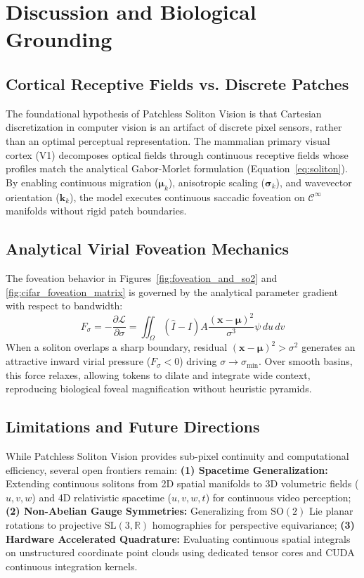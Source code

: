 \documentclass[10pt,twocolumn]{article}
\begin{document}
\section{Discussion and Biological Grounding}

\subsection{Cortical Receptive Fields vs. Discrete Patches}
The foundational hypothesis of Patchless Soliton Vision is that Cartesian discretization in computer vision is an artifact of discrete pixel sensors, rather than an optimal perceptual representation. The mammalian primary visual cortex (V1) decomposes optical fields through continuous receptive fields whose profiles match the analytical Gabor-Morlet formulation (Equation~\ref{eq:soliton}). By enabling continuous migration ($\mathbf{\mu}_k$), anisotropic scaling ($\mathbf{\sigma}_k$), and wavevector orientation ($\mathbf{k}_k$), the model executes continuous saccadic foveation on $\mathcal{C}^\infty$ manifolds without rigid patch boundaries.

\subsection{Analytical Virial Foveation Mechanics}
The foveation behavior in Figures~\ref{fig:foveation_and_so2} and \ref{fig:cifar_foveation_matrix} is governed by the analytical parameter gradient with respect to bandwidth:
\begin{equation}
    F_{\sigma} = -\frac{\partial \mathcal{L}}{\partial \sigma} = \iint_\Omega (\hat{I} - I) A \frac{(\mathbf{x} - \mathbf{\mu})^2}{\sigma^3} \psi \, du \, dv
\end{equation}
When a soliton overlaps a sharp boundary, residual $(\mathbf{x} - \mathbf{\mu})^2 > \sigma^2$ generates an attractive inward virial pressure ($F_\sigma < 0$) driving $\sigma \to \sigma_{\min}$. Over smooth basins, this force relaxes, allowing tokens to dilate and integrate wide context, reproducing biological foveal magnification without heuristic pyramids.

\subsection{Limitations and Future Directions}
While Patchless Soliton Vision provides sub-pixel continuity and computational efficiency, several open frontiers remain:
\textbf{(1) Spacetime Generalization:} Extending continuous solitons from 2D spatial manifolds to 3D volumetric fields ($u, v, w$) and 4D relativistic spacetime ($u, v, w, t$) for continuous video perception;
\textbf{(2) Non-Abelian Gauge Symmetries:} Generalizing from $\mathrm{SO}(2)$ Lie planar rotations to projective $\mathrm{SL}(3, \mathbb{R})$ homographies for perspective equivariance;
\textbf{(3) Hardware Accelerated Quadrature:} Evaluating continuous spatial integrals on unstructured coordinate point clouds using dedicated tensor cores and CUDA continuous integration kernels.
\end{document}
